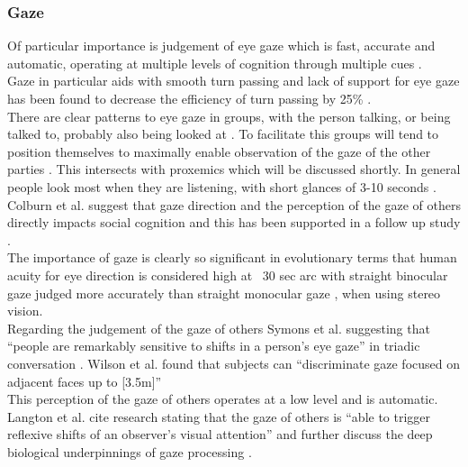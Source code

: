 \subsubsection{Gaze}
Of particular importance is judgement of eye gaze which is fast, accurate and automatic, operating at multiple levels of cognition through multiple cues \cite{Argyle,argyle1976gaze,Argyle1965,Argyle1976,Argyle1969, Kendon1967,Monk2002}.\\
Gaze in particular aids with smooth turn passing \cite{Hedge1978} \cite{Novick1996} and lack of support for eye gaze has been found to decrease the efficiency of turn passing by 25\% \cite{Vertegaal00effectsof}.\\
There are clear patterns to eye gaze in groups, with the person talking, or being talked to, probably also being looked at \cite{Vertegaal2001} \cite{Langton2000}. To facilitate this groups will tend to position themselves to maximally enable observation of the gaze of the other parties \cite{Kendon1967}. This intersects with proxemics which will be discussed shortly.  In general people look most when they are listening, with short glances of 3-10 seconds \cite{Argyle1965}. %
Colburn et al. suggest that gaze direction and the perception of the gaze of others directly impacts social cognition \cite{Colburn2000a} and this has been supported in a follow up study \cite{Macrae2002}.\\
The importance of gaze is clearly so significant in evolutionary terms that human acuity for eye direction is considered high at ~30 sec arc \cite{Symons2004} with straight binocular gaze judged more accurately than straight monocular gaze \cite{Kluttz2009}, when using stereo vision. \\
Regarding the judgement of the gaze of others Symons et al. suggesting that ``people are remarkably sensitive to shifts in a person's eye gaze'' in triadic conversation \cite{Symons2004}. Wilson et al. found that subjects can ``discriminate gaze focused on adjacent faces up to [3.5m]'' \cite{Wilson2000}\\
This perception of the gaze of others operates at a low level and is automatic. Langton et al. cite research stating that the gaze of others is ``able to trigger reflexive shifts of an observer's visual attention'' and further discuss the deep biological underpinnings of gaze processing \cite{doi:10.1080/713755908}. \\          
